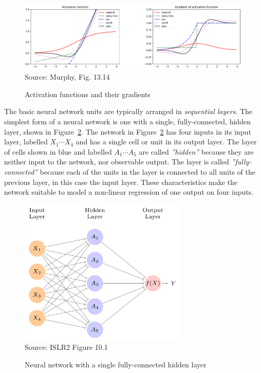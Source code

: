 \begin{figure}
\centering
\includegraphics[width=.9\textwidth]{screen6} \\

\scriptsize Source: Murphy, Fig. 13.14
\caption{Activation functions and their gradients}
\label{fig:activation}
\end{figure}

The basic neural network units are typically arranged in \emph{sequential layers}. The simplest form of a neural network is one with a single, fully-connected, hidden layer, shown in Figure~\ref{fig:screen1_chap15}. The network in Figure~\ref{fig:screen1_chap15} has four inputs in its input layer, labelled $X_1 \cdots X_4$ and has a single cell or unit in its output layer. The layer of cells shown in blue and labelled $A_1 \cdots A_5$ are called \emph{''hidden''} because they are neither input to the network, nor observable output. The layer is called \emph{''fully-connected''} because each of the units in the layer is connected to all units of the previous layer, in this case the input layer. These characteristics make the network suitable to model a non-linear regression of one output on four inputs. 

\begin{figure}
\centering
\includegraphics[height=2.75in]{screen1.png} \\

\scriptsize Source: ISLR2 Figure 10.1
\caption{Neural network with a single fully-connected hidden layer}
\label{fig:screen1_chap15}
\end{figure}

